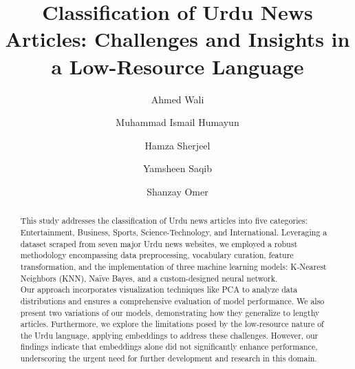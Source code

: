 \documentclass[sigconf]{acmart}
\begin{document}
\title{Classification of Urdu News Articles: Challenges and Insights in a Low-Resource Language}



\author{Ahmed Wali}
\affiliation{%
}



\author{Muhammad Ismail Humayun}
\affiliation{%
}

\author{Hamza Sherjeel}
\affiliation{%
}


\author{Yamsheen Saqib}
\affiliation{%
}

 

\author{Shanzay Omer}
\affiliation{%
}


\renewcommand{\shortauthors}{Habibi Group 9}

\begin{abstract}
This study addresses the classification of Urdu news articles into five categories: Entertainment, Business, Sports, Science-Technology, and International. Leveraging a dataset scraped from seven major Urdu news websites, we employed a robust methodology encompassing data preprocessing, vocabulary curation, feature transformation, and the implementation of three machine learning models: K-Nearest Neighbors (KNN), Naïve Bayes, and a custom-designed neural network.\\

Our approach incorporates visualization techniques like PCA to analyze data distributions and ensures a comprehensive evaluation of model performance. We also present two variations of our models, demonstrating how they generalize to lengthy articles. Furthermore, we explore the limitations posed by the low-resource nature of the Urdu language, applying embeddings to address these challenges. However, our findings indicate that embeddings alone did not significantly enhance performance, underscoring the urgent need for further development and research in this domain.
\end{abstract}
\end{document}
